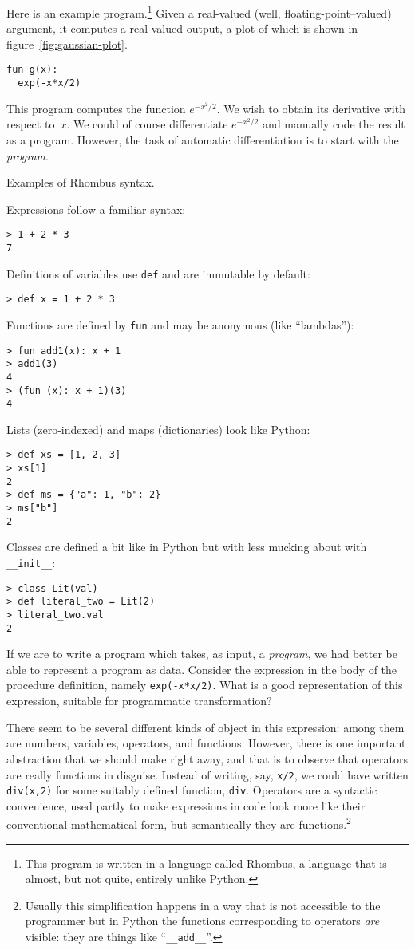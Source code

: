 \documentclass[11pt, a4paper]{article}
\newcommand{\cd}[1]{\texttt{#1}}
\begin{document}
Here is an example program.\footnote{This program is written in a
  language called Rhombus, a language that is almost, but not quite,
  entirely unlike Python.} Given a real-valued (well, floating-point--valued)
argument, it computes a real-valued output, a plot of which is shown
in figure~\ref{fig:gaussian-plot}.
\begin{verbatim}
fun g(x):
  exp(-x*x/2)
\end{verbatim}
This program computes the function $e^{-x^2/2}$. We wish to obtain its
derivative with respect to~$x$. We could of course
differentiate $e^{-x^2/2}$ and manually code the result as a
program. However, the task of automatic differentiation is to start
with the \emph{program}.
\begin{marginfigure}
  \caption{Examples of Rhombus syntax.}
  \footnotesize
  Expressions follow a familiar syntax:
\begin{verbatim}
> 1 + 2 * 3
7
\end{verbatim}
  Definitions of variables use \cd{def} and are immutable by default:
\begin{verbatim}
> def x = 1 + 2 * 3
\end{verbatim}
  Functions are defined by \cd{fun} and may be anonymous (like
  ``lambdas''):
\begin{verbatim}
> fun add1(x): x + 1
> add1(3)
4
> (fun (x): x + 1)(3)
4
\end{verbatim}
  Lists (zero-indexed) and maps (dictionaries) look like Python:
\begin{verbatim}
> def xs = [1, 2, 3]
> xs[1]
2
> def ms = {"a": 1, "b": 2}
> ms["b"]
2
\end{verbatim}
  Classes are defined a bit like in Python but with less mucking about
  with \cd{__init__}:
\begin{verbatim}
> class Lit(val)
> def literal_two = Lit(2)
> literal_two.val
2
\end{verbatim}
\end{marginfigure}

If we are to write a program which takes, as input, a \emph{program},
we had better be able to represent a program as data. Consider the
expression in the body of the procedure definition, namely
\cd{exp(-x*x/2)}. What is a good representation of this
expression, suitable for programmatic transformation? 

There seem to be several different kinds of object in this expression:
among them are numbers, variables, operators, and functions. However,
there is one important abstraction that we should make right away, and
that is to observe that operators are really functions in
disguise. Instead of writing, say, \cd{x/2}, we could have written
\cd{div(x,2)} for some suitably defined function, \cd{div}. Operators
are a syntactic convenience, used partly to make expressions in code
look more like their conventional mathematical form, but semantically
they are functions.\footnote{Usually this simplification happens in a
  way that is not accessible to the programmer but in Python the
  functions corresponding to operators \emph{are} visible: they are
  things like ``\cd{__add__}''.}
\end{document}
